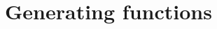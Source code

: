 

\setcounter{section}{2}
\setcounter{subsection}{1}
\setcounter{dfn}{0}

\section{Generating functions}


